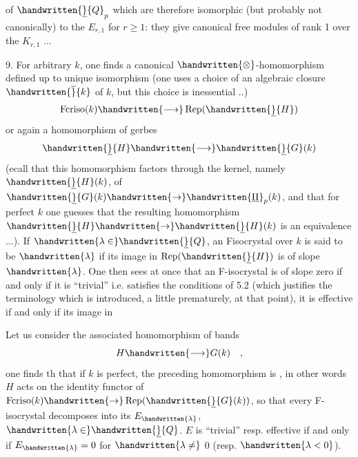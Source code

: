 of $\handwritten{\underline}{Q}_p$ \handwritten{)} which are therefore isomorphic  (but probably not canonically) to the $E_{r,1}$ for $r\geq1$: they give canonical free modules of rank 1 over the $K_{r,1}$ ...\handwritten{]}

9. For arbitrary $k$, one finds a  canonical $\handwritten{\otimes}$-homomorphism  defined up to unique isomorphism (one uses a choice of an algebraic closure $\handwritten{\overline}{k}$ of $k$, but this choice is inessential ..)
\[
\operatorname{Fcriso}(k)\handwritten{\longrightarrow}\operatorname{Rep}(\handwritten{\underline}{H})
\]
or again a homomorphism of gerbes
\[
\handwritten{\underline}{H}\handwritten{\longrightarrow}\handwritten{\underline}{G}(k)
\]
(ecall that this homomorphism factors through the kernel, namely  $\handwritten{\underline}{H}(k)$, of $\handwritten{\underline}{G}(k)\handwritten{\to}\handwritten{\underline{\Pi}}_p(k)$, and that for perfect $k$ one guesses that the resulting homomorphism $\handwritten{\underline}{H}\handwritten{\to}\handwritten{\underline}{H}(k)$ is an equivalence ...). If $\handwritten{\lambda\in}\handwritten{\underline}{Q}$, an F\deleted{(}\handwritten{-}isocrystal over $k$ is said to be   $\handwritten{\lambda}$ if its image in $\operatorname{Rep}(\handwritten{\underline}{H})$ is of slope $\handwritten{\lambda}$. One then sees at once that an F-isocrystal is of slope zero if and only if it is ``trivial'' i.e. satisfies the conditions of 5.2 (which justifies the terminology which is introduced, a little prematurely, at that point), it is effective if and only if its image in 

Let us consider the associated homomorphism of bands
\[
H\handwritten{\longrightarrow}G(k)\quad ,
\]
one finds th that if $k$ is perfect, the preceding homomorphism is , in other words $H$ acts on the identity functor of $\operatorname{Fcriso}(k)\handwritten{\to}\operatorname{Rep}(\handwritten{\underline}{G}(k))$, so that every F-isocrystal  decomposes into its  $E_{\handwritten{\lambda}}$, $\handwritten{\lambda\in}\handwritten{\underline}{Q}$. $E$ is ``trivial'' resp. effective if and only if $E_{\handwritten{\lambda}}=0$ for $\handwritten{\lambda\ne}$ 0 (resp. $\handwritten{\lambda<0}$).

